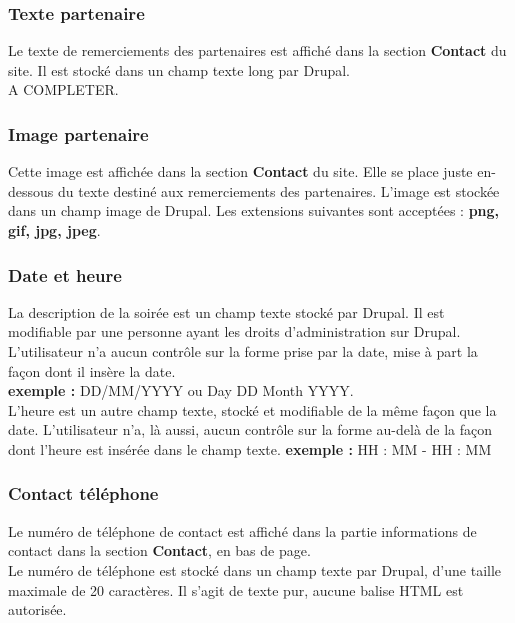 \documentclass[11pt]{report}
\begin{document}
\subsubsection{Texte partenaire}

Le texte de remerciements des partenaires est affiché dans la section
\textbf{Contact} du site. Il est stocké dans un champ texte long par Drupal. \\
A COMPLETER.

\subsubsection{Image partenaire}

Cette image est affichée dans la section \textbf{Contact} du site. Elle se place
juste en-dessous du texte destiné aux remerciements des partenaires.
L'image est stockée dans un champ image de Drupal.
Les extensions suivantes sont acceptées : \textbf{png, gif, jpg, jpeg}.

\subsubsection{Date et heure}

La description de la soirée est un champ texte stocké par Drupal. Il est
modifiable par une personne ayant les droits d'administration sur Drupal.
L'utilisateur n'a aucun contrôle sur la forme prise par la date, mise à part la
façon dont il insère la date. \\
\textbf{exemple :} DD/MM/YYYY ou Day DD Month YYYY. \\

L'heure est un autre champ texte, stocké et modifiable de la même façon que la
date.
L'utilisateur n'a, là aussi, aucun contrôle sur la forme au-delà de la façon
dont l'heure est insérée dans le champ texte.
\textbf{exemple :} HH : MM - HH : MM \\

\subsubsection{Contact téléphone}

Le numéro de téléphone de contact est affiché dans la partie informations de
contact dans la section \textbf{Contact}, en bas de page. \\
Le numéro de téléphone est stocké dans un champ texte par Drupal, d'une taille
maximale de 20 caractères. Il s'agit de texte pur, aucune balise HTML est autorisée.
\end{document}
